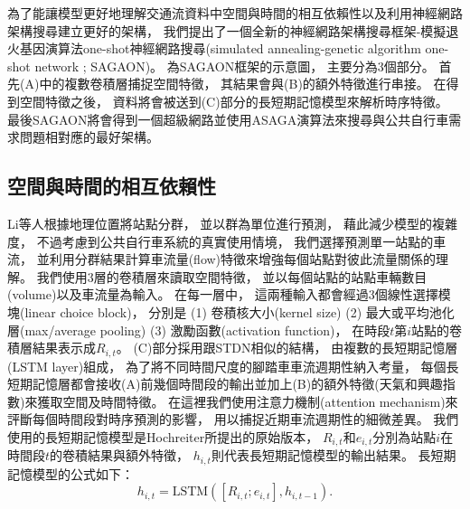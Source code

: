 \documentclass[a4paper,14pt]{extarticle}
\begin{document}
        為了能讓模型更好地理解交通流資料中空間與時間的相互依賴性以及利用神經網路架構搜尋建立更好的架構，
        我們提出了一個全新的神經網路架構搜尋框架-模擬退火基因演算法one-shot神經網路搜尋(simulated annealing-genetic algorithm one-shot network ; SAGAON)。
        為SAGAON框架的示意圖，
        主要分為3個部分。
        首先(A)中的複數卷積層捕捉空間特徵，
        其結果會與(B)的額外特徵進行串接。
        在得到空間特徵之後，
        資料將會被送到(C)部分的長短期記憶模型來解析時序特徵。
        最後SAGAON將會得到一個超級網路並使用ASAGA演算法來搜尋與公共自行車需求問題相對應的最好架構。
        
        \subsection{空間與時間的相互依賴性}
            
            Li等人\cite{li2015traffic}根據地理位置將站點分群，
            並以群為單位進行預測，
            藉此減少模型的複雜度，
            不過考慮到公共自行車系統的真實使用情境，
            我們選擇預測單一站點的車流，
            並利用分群結果計算車流量(flow)特徵來增強每個站點對彼此流量關係的理解。
            我們使用3層的卷積層來讀取空間特徵，
            並以每個站點的站點車輛數目(volume)以及車流量為輸入。
            在每一層中，
            這兩種輸入都會經過3個線性選擇模塊(linear choice block)，
            分別是 (1) 卷積核大小(kernel size) (2) 最大或平均池化層(max/average pooling) (3) 激勵函數(activation function)，
            在時段$t$第$i$站點的卷積層結果表示成$R_{i,t}$。
            (C)部分採用跟STDN相似的結構，
            由複數的長短期記憶層(LSTM layer)組成，
            為了將不同時間尺度的腳踏車車流週期性納入考量，
            每個長短期記憶層都會接收(A)前幾個時間段的輸出並加上(B)的額外特徵(天氣和興趣指數)來獲取空間及時間特徵。
            在這裡我們使用注意力機制(attention mechanism)來評斷每個時間段對時序預測的影響，
            用以捕捉近期車流週期性的細微差異。
            我們使用的長短期記憶模型是Hochreiter\cite{10.1162/neco.1997.9.8.1735}所提出的原始版本，
            $R_{i,t}$和$e_{i,t}$分別為站點$i$在時間段$t$的卷積結果與額外特徵，
            $h_{i,t}$則代表長短期記憶模型的輸出結果。
            長短期記憶模型的公式如下：
            \begin{equation}
                h_{i,t} = \text{LSTM}([R_{i,t};e_{i,t}],h_{i,t-1}).
            \end{equation}
\end{document}
